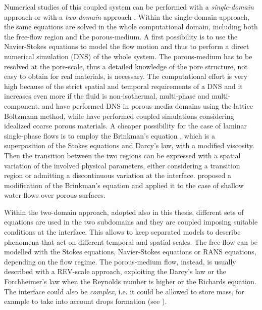 Numerical studies of this coupled system can be performed with a 
\emph{single-domain} approach or with a \emph{two-domain} approach 
\cite{tesi:fetzer}.
Within the single-domain approach, the same equations are solved in the whole 
computational domain, including both the free-flow region and the 
porous-medium. A first possibility is to use the Navier-Stokes equations to model the 
flow motion and thus to perform a direct numerical simulation (DNS) of the 
whole system. The porous-medium has to be resolved at the pore-scale, thus a 
detailed knowledge of the pore structure, not easy to obtain for real 
materials, is necessary. The computational effort is very high because 
of the strict spatial and temporal requirements of a DNS and it increases even 
more if the fluid is non-isothermal, multi-phase and multi-component. \textcite{intro:dns} and \textcite{intro:dns2} have performed DNS in 
porous-media domains using the lattice Boltzmann method, while \textcite{intro:yang} have performed coupled simulations considering idealized coarse porous materials.
A cheaper possibility for the case of laminar single-phase flows is to employ the Brinkman's equation 
\cite{intro:brinkman}, which is a superposition of the Stokes equations and 
Darcy's law, with a modified viscosity. %
Then the transition between the two 
regions can be expressed with a spatial variation of the involved physical 
parameters, either considering a transition region or admitting a discontinuous 
variation at the interface. \textcite{intro:shavit} proposed a modification of 
the Brinkman's equation and applied it to the case of shallow water flows over 
porous surfaces.

Within the two-domain approach, adopted also in this thesis, different sets of 
equations are used in the two subdomains and they are coupled imposing suitable 
conditions at the interface. This allows to keep separated models to describe phenomena that act on different temporal and spatial scales. The free-flow can be modelled with the Stokes 
equations, Navier-Stokes equations or RANS equations, depending on the flow 
regime. The porous-medium flow, instead, is usually described with a REV-scale approach, exploiting the 
Darcy's law or the Forchheimer's law when the Reynolds number is higher or the Richards equation. The interface could also be \emph{complex}, i.e. it could be allowed to store mass, for example to take into account drops formation (see \cite{tesi:baber}).

